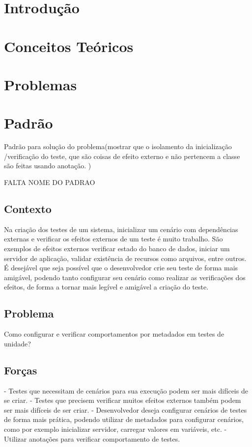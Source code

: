 \documentclass[12pt,a4paper,oneside]{book}
\begin{document}


\chapter{Introdução}

\chapter{Conceitos Teóricos}

\chapter{Problemas}


\chapter{Padrão}

Padrão para solução do problema(mostrar que o isolamento da inicialização /verificação do teste, que são coisas de efeito externo e não pertencem a classe são feitas  usando anotação. )

FALTA NOME DO PADRAO

\section{Contexto}
Na criação dos testes de um sistema, inicializar um cenário com dependências externas e verificar os efeitos externos de um teste é muito trabalho. São exemplos de efeitos externos verificar estado do banco de dados, iniciar um servidor de aplicação, validar existência de recursos como arquivos, entre outros. É desejável que seja possível que o desenvolvedor crie seu teste de forma mais amigável, podendo tanto configurar seu cenário como realizar as verificações dos efeitos, de forma a tornar mais legível e amigável a criação do teste.

\section{Problema}
Como configurar e verificar comportamentos por metadados em testes de unidade?

\section{Forças}
- Testes que necessitam de cenários para sua execução podem ser mais difíceis de se criar.
- Testes que precisem verificar muitos efeitos externos também podem ser mais difíceis de ser criar. 
- Desenvolvedor deseja configurar cenários de testes de forma mais prática, podendo utilizar de metadados para configurar cenários, como por exemplo inicializar servidor, carregar valores em variáveis, etc.
- Utilizar anotações para verificar comportamento de testes.
\end{document}
